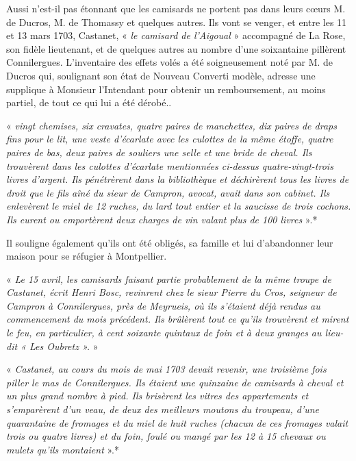 
Aussi n’est-il pas étonnant que les camisards ne portent pas dans leurs cœurs M. de Ducros,
M. de Thomassy et quelques autres. Ils vont se venger, et entre les 11 et 13 mars 1703,
Castanet, « \textit{le camisard de l’Aigoual} » accompagné de La Rose, son fidèle lieutenant, et de
quelques autres au nombre d’une soixantaine pillèrent Connilergues. L’inventaire des effets
volés a été soigneusement noté par M. de Ducros qui, soulignant son état de Nouveau
Converti modèle, adresse une supplique à Monsieur l’Intendant pour obtenir un
remboursement, au moins partiel, de tout ce qui lui a été dérobé..

« \textit{vingt chemises, six cravates, quatre paires de manchettes, dix paires de draps fins pour le lit,
une veste d’écarlate avec les culottes de la même étoffe, quatre paires de bas, deux paires de
souliers une selle et une bride de cheval. Ils trouvèrent dans les culottes d’écarlate
mentionnées ci-dessus quatre-vingt-trois livres d’argent. Ils pénétrèrent dans la bibliothèque
et déchirèrent tous les livres de droit que le fils aîné du sieur de Campron, avocat, avait dans
son cabinet. Ils enlevèrent le miel de 12 ruches, du lard tout entier et la saucisse de trois
cochons. Ils eurent ou emportèrent deux charges de vin valant plus de 100 livres} ».*

Il souligne également qu’ils ont été obligés, sa famille et lui d’abandonner leur maison pour
se réfugier à Montpellier.

\vspace{0.2cm}

« \textit{Le 15 avril, les camisards faisant partie probablement de la même troupe de Castanet, écrit
Henri Bosc, revinrent chez le sieur Pierre du Cros, seigneur de Campron à Connilergues,
près de Meyrueis, où ils s’étaient déjà rendus au commencement du mois précédent. Ils
brûlèrent tout ce qu’ils trouvèrent et mirent le feu, en particulier, à cent soixante quintaux de
foin et à deux granges au lieu-dit « Les Oubretz ».} »

\vspace{0.2cm}

« \textit{Castanet, au cours du mois de mai 1703 devait revenir, une troisième fois piller le mas de
Connilergues. Ils étaient une quinzaine de camisards à cheval et un plus grand nombre à
pied. Ils brisèrent les vitres des appartements et s’emparèrent d’un veau, de deux des
meilleurs moutons du troupeau, d’une quarantaine de fromages et du miel de huit ruches
(chacun de ces fromages valait trois ou quatre livres) et du foin, foulé ou mangé par les 12 à
15 chevaux ou mulets qu’ils montaient} ».*

